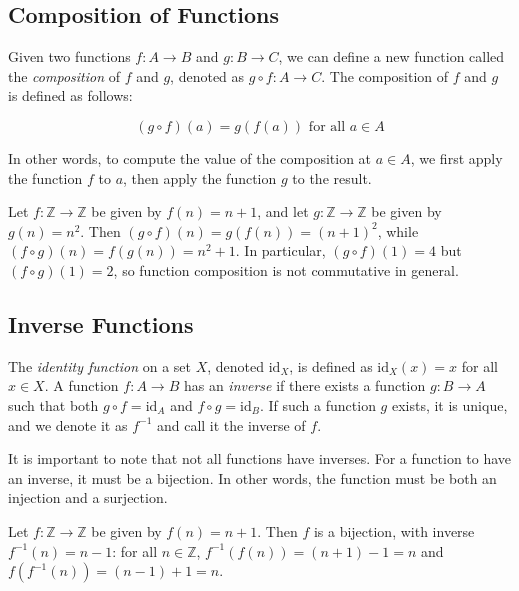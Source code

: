 \subsection{Composition of Functions}

Given two functions $f : A \to B$ and $g : B \to C$, we can define a new function called the \textit{composition} of $f$ and $g$, denoted as $g \circ f : A \to C$. The composition of $f$ and $g$ is defined as follows:

\[
(g \circ f)(a) = g(f(a)) \text{ for all } a \in A
\]

In other words, to compute the value of the composition at $a \in A$, we first apply the function $f$ to $a$, then apply the function $g$ to the result.

\begin{example}
Let $f : \mathbb{Z} \to \mathbb{Z}$ be given by $f(n) = n + 1$, and let $g : \mathbb{Z} \to \mathbb{Z}$ be given by $g(n) = n^2$. Then $(g \circ f)(n) = g(f(n)) = (n+1)^2$, while $(f \circ g)(n) = f(g(n)) = n^2 + 1$. In particular, $(g \circ f)(1) = 4$ but $(f \circ g)(1) = 2$, so function composition is not commutative in general.
\end{example}

\subsection{Inverse Functions}

\begin{definition}
The \textit{identity function} on a set $X$, denoted $\text{id}_X$, is defined as $\text{id}_X(x) = x$ for all $x \in X$. A function $f : A \to B$ has an \textit{inverse} if there exists a function $g : B \to A$ such that both $g \circ f = \text{id}_A$ and $f \circ g = \text{id}_B$. If such a function $g$ exists, it is unique, and we denote it as $f^{-1}$ and call it the inverse of $f$.
\end{definition}

It is important to note that not all functions have inverses. For a function to have an inverse, it must be a bijection. In other words, the function must be both an injection and a surjection.

\begin{example}
Let $f : \mathbb{Z} \to \mathbb{Z}$ be given by $f(n) = n + 1$. Then $f$ is a bijection, with inverse $f^{-1}(n) = n - 1$: for all $n \in \mathbb{Z}$, $f^{-1}(f(n)) = (n+1) - 1 = n$ and $f(f^{-1}(n)) = (n - 1) + 1 = n$.
\end{example}

